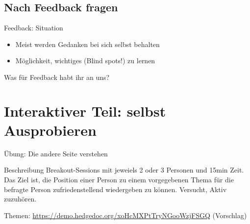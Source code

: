 \subsection{Nach Feedback fragen}

\begin{frame}[c]{Feedback: Situation}
    \large
    \begin{itemize}[<+(1)->]
        \item Meist werden Gedanken bei sich selbst behalten
        \item Möglichkeit, wichtiges (Blind spots!) zu lernen
    \end{itemize}
\end{frame}


\begin{frame}[standout]
    Was für Feedback habt ihr an uns?
\end{frame}




\section{Interaktiver Teil: selbst Ausprobieren}

\begin{frame}[c]{Übung: Die andere Seite verstehen}
    \large
    \begin{block}{Beschreibung}
    Breakout-Sessions mit jeweiels 2 oder 3 Personen und 15min Zeit.
    Das Ziel ist, die Position einer Person zu einem vorgegebenen Thema
    für die befragte Person zufriedenstellend wiedergeben zu können.
    Versucht, Aktiv zuzuhören.
    \end{block}
    Themen: \url{https://demo.hedgedoc.org/xoHcMXPtTryNGooWzjFSGQ} (Vorschlag)
\end{frame}
